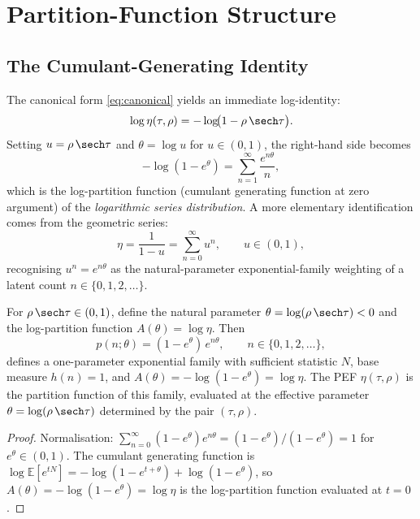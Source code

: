 \section{Partition-Function Structure}
\label{sec:partition}

\subsection{The Cumulant-Generating Identity}

The canonical form \cref{eq:canonical} yields an immediate log-identity:
\begin{equation}
  \log\eta(\tau,\rho)
  = -\log\!\bigl(1 - \rho\,\sech\tau\bigr).
  \label{eq:logeta_identity}
\end{equation}
Setting $u = \rho\,\sech\tau$ and $\theta = \log u$ for $u \in (0,1)$, the right-hand side becomes
\[
  -\log(1 - e^{\theta}) = \sum_{n=1}^{\infty}\frac{e^{n\theta}}{n},
\]
which is the log-partition function (cumulant generating function at zero argument) of the \emph{logarithmic series distribution}. A more elementary identification comes from the geometric series:
\[
  \eta = \frac{1}{1 - u} = \sum_{n=0}^{\infty}u^{n},\qquad u \in (0,1),
\]
recognising $u^n = e^{n\theta}$ as the natural-parameter exponential-family weighting of a latent count $n \in \{0,1,2,\dotsc\}$.

\begin{theorem}
\label{thm:exp_family}
For $\rho\,\sech\tau \in (0,1)$, define the natural parameter $\theta = \log(\rho\,\sech\tau) < 0$ and the log-partition function $A(\theta) = \log\eta$.  Then
\begin{equation}
  p(n;\theta) = (1-e^{\theta})\,e^{n\theta},\qquad n \in \{0,1,2,\dotsc\},
  \label{eq:geo_family}
\end{equation}
defines a one-parameter exponential family with sufficient statistic $N$, base measure $h(n) = 1$, and $A(\theta) = -\log(1-e^{\theta}) = \log\eta$.  The PEF $\eta(\tau,\rho)$ is the partition function of this family, evaluated at the effective parameter $\theta = \log(\rho\,\sech\tau)$ determined by the pair $(\tau,\rho)$.
\end{theorem}

\begin{proof}
Normalisation: $\sum_{n=0}^{\infty}(1-e^{\theta})e^{n\theta} = (1-e^{\theta})/(1-e^{\theta}) = 1$ for $e^{\theta} \in (0,1)$.  The cumulant generating function is $\log\mathbb{E}[e^{tN}] = -\log(1-e^{t+\theta}) + \log(1-e^{\theta})$, so $A(\theta) = -\log(1-e^{\theta}) = \log\eta$ is the log-partition function evaluated at $t=0$.
\end{proof}


